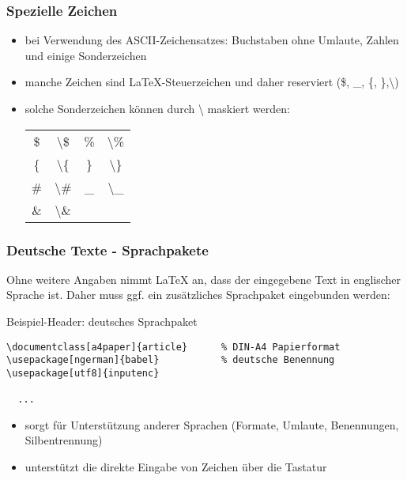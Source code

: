 \begin{frame}
	\frametitle{Spezielle Zeichen}
	\begin{itemize}
		\item bei Verwendung des ASCII-Zeichensatzes: Buchstaben ohne Umlaute, Zahlen und einige Sonderzeichen
		\item manche Zeichen sind \LaTeX-Steuerzeichen und daher reserviert (\$, \_, \{, \},\textbackslash )
        \item solche Sonderzeichen können durch \textbackslash{} maskiert werden: \\[0.5cm]
		\begin{center}
			\begin{tabular}{|cc|cc|} \hline
				\$ & \textbackslash\$ & \% & \textbackslash\% \\
				\{ & \textbackslash\{ & \} & \textbackslash\} \\
				\# & \textbackslash\# & \_ & \textbackslash\_ \\
				\& & \textbackslash\& & & \\ \hline
			\end{tabular}
		\end{center}
	\end{itemize}
\end{frame}

\begin{frame}[fragile]
	\frametitle{Deutsche Texte - Sprachpakete}
    Ohne weitere Angaben nimmt \LaTeX{} an, dass der eingegebene Text in englischer Sprache ist. Daher muss ggf. ein zusätzliches Sprachpaket eingebunden werden:
	\begin{center}
		\begin{block}{Beispiel-Header: deutsches Sprachpaket}
			\begin{lstlisting}
\documentclass[a4paper]{article}      % DIN-A4 Papierformat
\usepackage[ngerman]{babel}           % deutsche Benennung
\usepackage[utf8]{inputenc}

  ...

			\end{lstlisting}
		\end{block}
	\end{center} \vspace{-1cm}
	\begin{itemize}
		\item {} sorgt für Unterstützung anderer Sprachen (Formate, Umlaute, Benennungen, Silbentrennung)
		\item {} unterstützt die direkte Eingabe von Zeichen über die Tastatur
	\end{itemize}
\end{frame}


